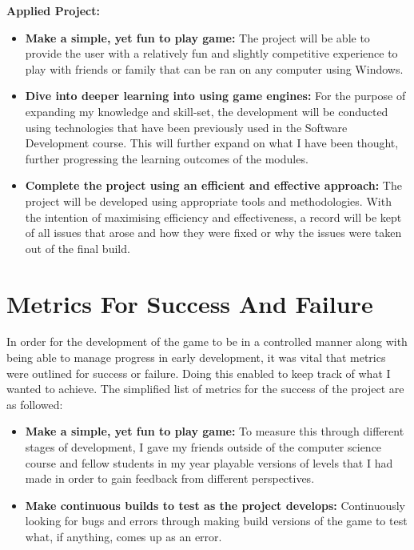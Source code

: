 \textbf {Applied Project:}

\begin{itemize}
  \item \textbf {Make a simple, yet fun to play game:} The project will be able to provide the user with a relatively fun and slightly competitive experience to play with friends or family that can be ran on any computer using Windows. \par
  \item \textbf {Dive into deeper learning into using game engines:} For the purpose of expanding my knowledge and skill-set, the development will be conducted using technologies that have been previously used in the Software Development course. This will further expand on what I have been thought, further progressing the learning outcomes of the modules.\par
  \item \textbf {Complete the project using an efficient and effective approach:} The project will be developed using appropriate tools and methodologies. With the intention of maximising efficiency and effectiveness, a record will be kept of all issues that arose and how they were fixed or why the issues were taken out of the final build.\par
\end{itemize}



\section{Metrics For Success And Failure}

In order for the development of the game to be in a controlled manner along with being able to manage progress in early development, it was vital that metrics were outlined for success or failure. Doing this enabled to keep track of what I wanted to achieve. The simplified list of metrics for the success of the project are as followed:

\begin{itemize}
  \item \textbf {Make a simple, yet fun to play game:} To measure this through different stages of development, I gave my friends outside of the computer science course and fellow students in my year playable versions of levels that I had made in order to gain feedback from different perspectives. \par
  \item \textbf {Make continuous builds to test as the project develops:} Continuously looking for bugs and errors through making build versions of the game to test what, if anything, comes up as an error.
\end{itemize}


